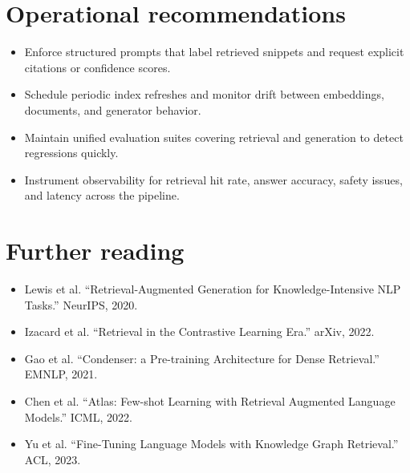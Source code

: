 \documentclass{article}
\begin{document}
\section*{Operational recommendations}
\begin{itemize}
  \item Enforce structured prompts that label retrieved snippets and request explicit citations or confidence scores.
  \item Schedule periodic index refreshes and monitor drift between embeddings, documents, and generator behavior.
  \item Maintain unified evaluation suites covering retrieval and generation to detect regressions quickly.
  \item Instrument observability for retrieval hit rate, answer accuracy, safety issues, and latency across the pipeline.
\end{itemize}

\section*{Further reading}
\begin{itemize}
  \item Lewis et al. ``Retrieval-Augmented Generation for Knowledge-Intensive NLP Tasks.'' NeurIPS, 2020.
  \item Izacard et al. ``Retrieval in the Contrastive Learning Era.'' arXiv, 2022.
  \item Gao et al. ``Condenser: a Pre-training Architecture for Dense Retrieval.'' EMNLP, 2021.
  \item Chen et al. ``Atlas: Few-shot Learning with Retrieval Augmented Language Models.'' ICML, 2022.
  \item Yu et al. ``Fine-Tuning Language Models with Knowledge Graph Retrieval.'' ACL, 2023.
\end{itemize}
\end{document}
